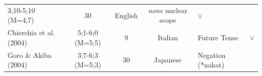 \documentclass[oneside]{report}
\theoremstyle{definition}
\theoremstyle{definition}
\theoremstyle{definition}
\theoremstyle{remark}
\begin{document}
\begin{longtable}[]{@{}lccclc@{}}
\begin{minipage}[t]{0.07\columnwidth}
3;10-5;10 (M=4;7)\strut
\end{minipage} & \begin{minipage}[t]{0.05\columnwidth}\centering\strut
30\strut
\end{minipage} & \begin{minipage}[t]{0.10\columnwidth}\centering\strut
English\strut
\end{minipage} & \begin{minipage}[t]{0.25\columnwidth}\raggedright\strut
\emph{none} nuclear scope\strut
\end{minipage} & \begin{minipage}[t]{0.13\columnwidth}\centering\strut
\(\lor\)\strut
\end{minipage}\tabularnewline
\begin{minipage}[t]{0.23\columnwidth}\raggedright\strut
Chierchia et al. (2004)\strut
\end{minipage} & \begin{minipage}[t]{0.07\columnwidth}\centering\strut
5;1-6;0 (M=5;5)\strut
\end{minipage} & \begin{minipage}[t]{0.05\columnwidth}\centering\strut
9\strut
\end{minipage} & \begin{minipage}[t]{0.10\columnwidth}\centering\strut
Italian\strut
\end{minipage} & \begin{minipage}[t]{0.25\columnwidth}\raggedright\strut
Future Tense\strut
\end{minipage} & \begin{minipage}[t]{0.13\columnwidth}\centering\strut
\(\lor\)\strut
\end{minipage}\tabularnewline
\begin{minipage}[t]{0.23\columnwidth}\raggedright\strut
Goro \& Akiba (2004)\strut
\end{minipage} & \begin{minipage}[t]{0.07\columnwidth}\centering\strut
3;7-6;3 (M=5;3)\strut
\end{minipage} & \begin{minipage}[t]{0.05\columnwidth}\centering\strut
30\strut
\end{minipage} & \begin{minipage}[t]{0.10\columnwidth}\centering\strut
Japanese\strut
\end{minipage} & \begin{minipage}[t]{0.25\columnwidth}\raggedright\strut
Negation (*nakat)\strut

\end{minipage}
\end{longtable}
\end{document}

